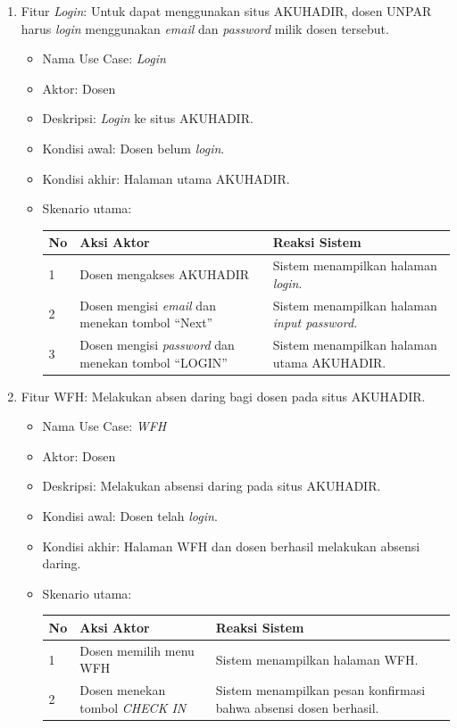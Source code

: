 \begin{enumerate}
	\item Fitur \textit{Login}: Untuk dapat menggunakan situs AKUHADIR, dosen UNPAR harus \textit{login} menggunakan \textit{email} dan \textit{password} milik dosen tersebut.
	\begin{itemize}
		\item Nama Use Case: \textit{Login}
		\item Aktor: Dosen
		\item Deskripsi: \textit{Login} ke situs AKUHADIR.
		\item Kondisi awal: Dosen belum \textit{login}.
		\item Kondisi akhir: Halaman utama AKUHADIR.
		\item Skenario utama:
		\begin{table}[h!]
			\centering
			\label{}
			\begin{tabular}{ | m{0.5cm} | m{7cm}| m{6cm} | } 
				\hline
				No & Aksi Aktor & Reaksi Sistem \\ 
				\hline
				1 & Dosen mengakses AKUHADIR  & Sistem menampilkan halaman \textit{login}.
				\\ 
				\hline
				2 & Dosen mengisi \textit{email} dan menekan tombol ``Next'' & Sistem menampilkan halaman \textit{input password}.
				\\ 
				\hline
				3 & Dosen mengisi \textit{password} dan menekan tombol ``LOGIN'' & Sistem menampilkan halaman utama AKUHADIR.
				\\ 
				\hline
			\end{tabular}
		\end{table}
	\end{itemize}
	\item Fitur WFH: Melakukan absen daring bagi dosen pada situs AKUHADIR.
	\begin{itemize}
		\item Nama Use Case: \textit{WFH}
		\item Aktor: Dosen
		\item Deskripsi: Melakukan absensi daring pada situs AKUHADIR.
		\item Kondisi awal: Dosen telah \textit{login}.
		\item Kondisi akhir: Halaman WFH dan dosen berhasil melakukan absensi daring.
		\item Skenario utama:
		\begin{table}[h!]
			\centering
			\label{}
			\begin{tabular}{ | m{0.5cm} | m{7cm}| m{6cm} | } 
				\hline
				No & Aksi Aktor & Reaksi Sistem \\ 
				\hline
				1 & Dosen memilih menu WFH  & Sistem menampilkan halaman WFH.
				\\ 
				\hline
				2 & Dosen menekan tombol \textit{CHECK IN} & Sistem menampilkan pesan konfirmasi bahwa absensi dosen berhasil.
				\\ 
				\hline
			\end{tabular}
		\end{table}	
	\end{itemize}
\end{enumerate}

